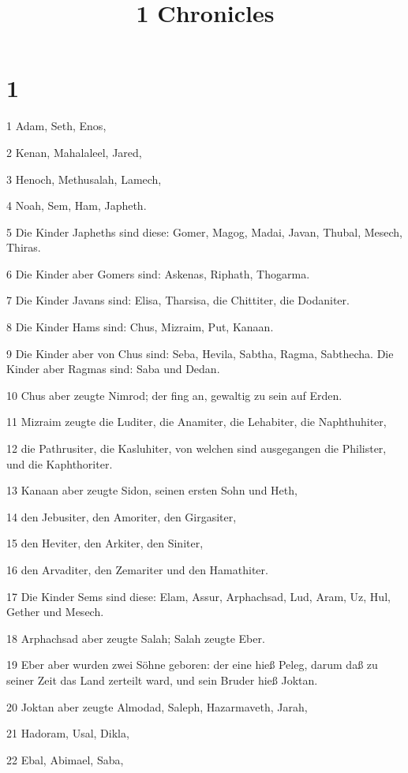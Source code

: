 

\title{1 Chronicles}


\chapter{1}

\par 1 Adam, Seth, Enos,
\par 2 Kenan, Mahalaleel, Jared,
\par 3 Henoch, Methusalah, Lamech,
\par 4 Noah, Sem, Ham, Japheth.
\par 5 Die Kinder Japheths sind diese: Gomer, Magog, Madai, Javan, Thubal, Mesech, Thiras.
\par 6 Die Kinder aber Gomers sind: Askenas, Riphath, Thogarma.
\par 7 Die Kinder Javans sind: Elisa, Tharsisa, die Chittiter, die Dodaniter.
\par 8 Die Kinder Hams sind: Chus, Mizraim, Put, Kanaan.
\par 9 Die Kinder aber von Chus sind: Seba, Hevila, Sabtha, Ragma, Sabthecha. Die Kinder aber Ragmas sind: Saba und Dedan.
\par 10 Chus aber zeugte Nimrod; der fing an, gewaltig zu sein auf Erden.
\par 11 Mizraim zeugte die Luditer, die Anamiter, die Lehabiter, die Naphthuhiter,
\par 12 die Pathrusiter, die Kasluhiter, von welchen sind ausgegangen die Philister, und die Kaphthoriter.
\par 13 Kanaan aber zeugte Sidon, seinen ersten Sohn und Heth,
\par 14 den Jebusiter, den Amoriter, den Girgasiter,
\par 15 den Heviter, den Arkiter, den Siniter,
\par 16 den Arvaditer, den Zemariter und den Hamathiter.
\par 17 Die Kinder Sems sind diese: Elam, Assur, Arphachsad, Lud, Aram, Uz, Hul, Gether und Mesech.
\par 18 Arphachsad aber zeugte Salah; Salah zeugte Eber.
\par 19 Eber aber wurden zwei Söhne geboren: der eine hieß Peleg, darum daß zu seiner Zeit das Land zerteilt ward, und sein Bruder hieß Joktan.
\par 20 Joktan aber zeugte Almodad, Saleph, Hazarmaveth, Jarah,
\par 21 Hadoram, Usal, Dikla,
\par 22 Ebal, Abimael, Saba,
